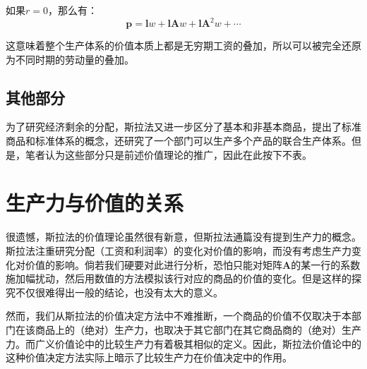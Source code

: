 如果$r=0$，那么有：
\begin{equation}
    \bm{p} = \bm{l}w + \bm{l}\bm{A}w + \bm{l}\bm{A}^2w + \cdots
\end{equation}

这意味着整个生产体系的价值本质上都是无穷期工资的叠加，所以可以被完全还原为不同时期的劳动量的叠加。

\subsection{其他部分}

为了研究经济剩余的分配，斯拉法又进一步区分了基本和非基本商品，提出了标准商品和标准体系的概念，还研究了一个部门可以生产多个产品的联合生产体系。但是，笔者认为这些部分只是前述价值理论的推广，因此在此按下不表。

\section{生产力与价值的关系}

很遗憾，斯拉法的价值理论虽然很有新意，但斯拉法通篇没有提到生产力的概念。斯拉法注重研究分配（工资和利润率）的变化对价值的影响，而没有考虑生产力变化对价值的影响。倘若我们硬要对此进行分析，恐怕只能对矩阵$\bm{A}$的某一行的系数施加幅扰动，然后用数值的方法模拟该行对应的商品的价值的变化。但是这样的探究不仅很难得出一般的结论，也没有太大的意义。

然而，我们从斯拉法的价值决定方法中不难推断，一个商品的价值不仅取决于本部门在该商品上的（绝对）生产力，也取决于其它部门在其它商品商的（绝对）生产力。而广义价值论中的比较生产力有着极其相似的定义。因此，斯拉法价值论中的这种价值决定方法实际上暗示了比较生产力在价值决定中的作用。